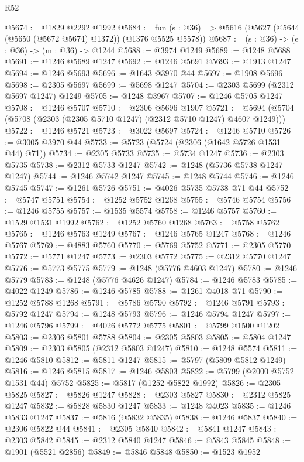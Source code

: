 \begin{lexlean}{R52}
\begin{coremodule}
@5674 := @1829 @2292 @1992
@5684 := fun (s : @36) => @5616 (@5627 (@5644 (@5650 (@5672 @5674) @1372)) (@1376 @5525 @5578))
@5687 := (s : @36) -> (e : @36) -> (m : @36) -> @1244
@5688 := @3974 @1249
@5689 := @1248 @5688
@5691 := @1246 @5689 @1247
@5692 := @1246 @5691
@5693 := @1913 @1247
@5694 := @1246 @5693
@5696 := @1643 @3970 @44
@5697 := @1908 @5696
@5698 := @2305 @5697
@5699 := @5698 @1247
@5704 := @2303 @5699 (@2312 @5697 @1247) @1249
@5705 := @1248 @3967
@5707 := @1246 @5705 @1247
@5708 := @1246 @5707
@5710 := @2306 @5696 @1907
@5721 := @5694 (@5704 (@5708 (@2303 (@2305 @5710 @1247) (@2312 @5710 @1247) @4607 @1249)))
@5722 := @1246 @5721
@5723 := @3022 @5697
@5724 := @1246 @5710
@5726 := @3005 @3970 @44
@5733 := @5723 (@5724 (@2306 (@1642 @5726 @1531 @44) @71))
@5734 := @2305 @5733
@5735 := @5734 @1247
@5736 := @2303 @5735
@5738 := @2312 @5733 @1247
@5742 := @1248 (@5736 @5738 @1247 @1247)
@5744 := @1246 @5742 @1247
@5745 := @1248 @5744
@5746 := @1246 @5745
@5747 := @1261 @5726
@5751 := @4026 @5735 @5738 @71 @44
@5752 := @5747 @5751
@5754 := @1252 @5752 @1268
@5755 := @5746 @5754
@5756 := @1246 @5755
@5757 := @1535 @5574
@5758 := @1246 @5757
@5760 := @1529 @1531 @1992
@5762 := @1252 @5760 @1268
@5763 := @5758 @5762
@5765 := @1246 @5763 @1249
@5767 := @1246 @5765 @1247
@5768 := @1246 @5767
@5769 := @4883 @5760
@5770 := @5769 @5752
@5771 := @2305 @5770
@5772 := @5771 @1247
@5773 := @2303 @5772
@5775 := @2312 @5770 @1247
@5776 := @5773 @5775
@5779 := @1248 (@5776 @4603 @1247)
@5780 := @1246 @5779
@5783 := @1248 (@5776 @4626 @1247)
@5784 := @1246 @5783
@5785 := @4022 @1249
@5786 := @1246 @5785
@5788 := @1261 @4018 @71
@5790 := @1252 @5788 @1268
@5791 := @5786 @5790
@5792 := @1246 @5791
@5793 := @5792 @1247
@5794 := @1248 @5793
@5796 := @1246 @5794 @1247
@5797 := @1246 @5796
@5799 := @4026 @5772 @5775
@5801 := @5799 @1500 @1202
@5803 := @2306 @5801 @5788
@5804 := @2305 @5803
@5805 := @5804 @1247
@5809 := @2303 @5805 (@2312 @5803 @1247)
@5810 := @1248 @5574
@5811 := @1246 @5810
@5812 := @5811 @1247
@5815 := @5797 (@5809 @5812 @1249)
@5816 := @1246 @5815
@5817 := @1246 @5803
@5822 := @5799 (@2000 @5752 @1531 @44) @5752
@5825 := @5817 (@1252 @5822 @1992)
@5826 := @2305 @5825
@5827 := @5826 @1247
@5828 := @2303 @5827
@5830 := @2312 @5825 @1247
@5832 := @5828 @5830 @1247
@5833 := @1248 @4023
@5835 := @1246 @5833 @1247
@5837 := @5816 (@5832 @5835)
@5838 := @1246 @5837
@5840 := @2306 @5822 @44
@5841 := @2305 @5840
@5842 := @5841 @1247
@5843 := @2303 @5842
@5845 := @2312 @5840 @1247
@5846 := @5843 @5845
@5848 := @1901 (@5521 @2856)
@5849 := @5846 @5848
@5850 := @1523 @1952

\end{coremodule}
\end{lexlean}
